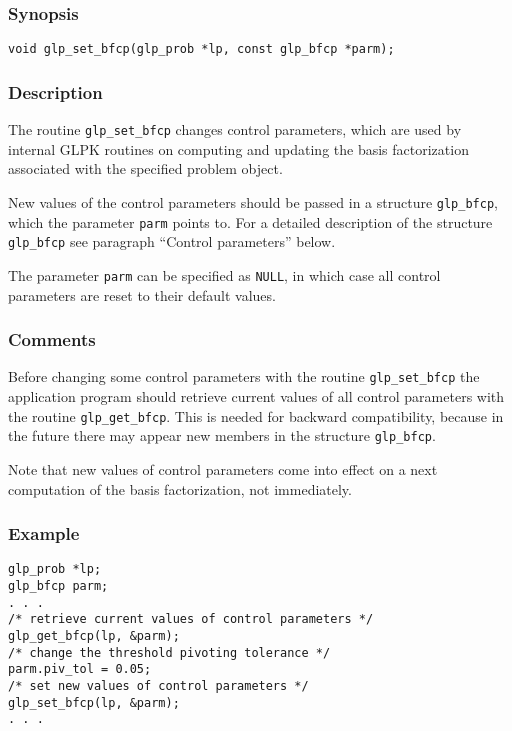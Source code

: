 \subsubsection*{Synopsis}

\begin{verbatim}
void glp_set_bfcp(glp_prob *lp, const glp_bfcp *parm);
\end{verbatim}

\subsubsection*{Description}

The routine \verb|glp_set_bfcp| changes control parameters, which are
used by internal GLPK routines on computing and updating the basis
factorization associated with the specified problem object.

New values of the control parameters should be passed in a structure
\verb|glp_bfcp|, which the parameter \verb|parm| points to. For a
detailed description of the structure \verb|glp_bfcp| see paragraph
``Control parameters'' below.

The parameter \verb|parm| can be specified as \verb|NULL|, in which case
all control parameters are reset to their default values.

\subsubsection*{Comments}

Before changing some control parameters with the routine
\verb|glp_set_bfcp| the application program should retrieve current
values of all control parameters with the routine \verb|glp_get_bfcp|.
This is needed for backward compatibility, because in the future there
may appear new members in the structure \verb|glp_bfcp|.

Note that new values of control parameters come into effect on a next
computation of the basis factorization, not immediately.

\subsubsection*{Example}

\begin{verbatim}
glp_prob *lp;
glp_bfcp parm;
. . .
/* retrieve current values of control parameters */
glp_get_bfcp(lp, &parm);
/* change the threshold pivoting tolerance */
parm.piv_tol = 0.05;
/* set new values of control parameters */
glp_set_bfcp(lp, &parm);
. . .
\end{verbatim}

